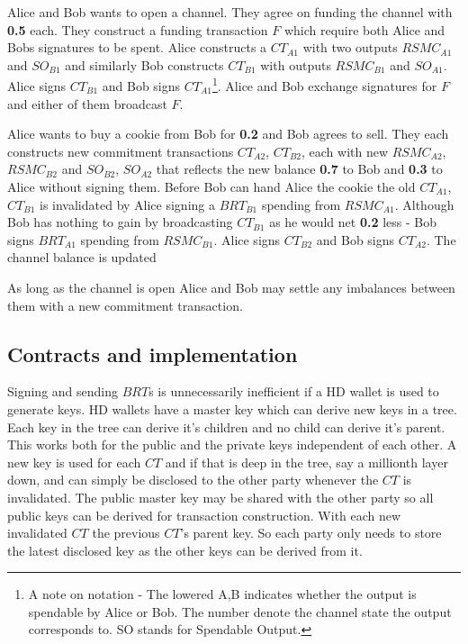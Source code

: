 Alice and Bob wants to open a channel. They agree on funding the channel with \textbf{0.5\bitcoin} each. They construct a funding transaction $F$ which require both Alice and Bobs signatures to be spent. Alice constructs a $CT_{A1}$ with two outputs $RSMC_{A1}$ and $SO_{B1}$ and similarly Bob constructs $CT_{B1}$ with outputs $RSMC_{B1}$ and $SO_{A1}$. Alice signs $CT_{B1}$ and Bob signs $CT_{A1}$\footnote{A note on notation - The lowered A,B indicates whether the output is spendable by Alice or Bob. The number denote the channel state the output corresponds to. SO stands for Spendable Output.}. Alice and Bob exchange signatures for $F$ and either of them broadcast $F$.

Alice wants to buy a cookie from Bob for \textbf{0.2\bitcoin} and Bob agrees to sell. They each constructs new commitment transactions $CT_{A2}$, $CT_{B2}$, each with new $RSMC_{A2}$, $RSMC_{B2}$ and $SO_{B2}$, $SO_{A2}$ that reflects the new balance \textbf{0.7\bitcoin} to Bob and \textbf{0.3\bitcoin} to Alice without signing them. Before Bob can hand Alice the cookie the old $CT_{A1}$, $CT_{B1}$ is invalidated by Alice signing a $BRT_{B1}$ spending from $RSMC_{A1}$. Although Bob has nothing to gain by broadcasting $CT_{B1}$ as he would net \textbf{0.2\bitcoin} less - Bob signs $BRT_{A1}$ spending from $RSMC_{B1}$. Alice signs $CT_{B2}$ and Bob signs $CT_{A2}$. The channel balance is updated

As long as the channel is open Alice and Bob may settle any imbalances between them with a new commitment transaction.  

\subsection{Contracts and implementation}

Signing and sending $BRT$s is unnecessarily inefficient if a HD wallet is used to generate keys\cite{bip:0032:hd:wallet}. HD wallets have a master key which can derive new keys in a tree. Each key in the tree can derive it's children and no child can derive it's parent. This works both for the public and the private keys independent of each other. A new key is used for each $CT$ and if that is deep in the tree, say a millionth layer down, and can simply be disclosed to the other party whenever the $CT$ is invalidated. The public master key may be shared with the other party so all public keys can be derived for transaction construction. With each new invalidated $CT$ the previous $CT$'s parent key. So each party only needs to store the latest disclosed key as the other keys can be derived from it.

